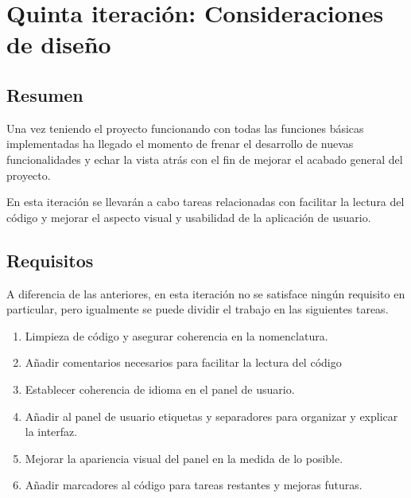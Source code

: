 
\section{Quinta iteración: Consideraciones de diseño}
    \subsection{Resumen}
    
        Una vez teniendo el proyecto funcionando con todas las funciones básicas implementadas ha llegado el momento de frenar el desarrollo de nuevas funcionalidades y echar la vista atrás con el fin de mejorar el acabado general del proyecto.
        
        En esta iteración se llevarán a cabo tareas relacionadas con facilitar la lectura del código y mejorar el aspecto visual y usabilidad de la aplicación de usuario.
    
    \subsection{Requisitos}
    
        A diferencia de las anteriores, en esta iteración no se satisface ningún requisito en particular, pero igualmente se puede dividir el trabajo en las siguientes tareas.
        
        \begin{enumerate}
            \item Limpieza de código y asegurar coherencia en la nomenclatura.
            \item Añadir comentarios necesarios para facilitar la lectura del código
            \item Establecer coherencia de idioma en el panel de usuario.
            \item Añadir al panel de usuario etiquetas y separadores para organizar y explicar la interfaz.
            \item Mejorar la apariencia visual del panel en la medida de lo posible.
            \item Añadir marcadores al código para tareas restantes y mejoras futuras. 
        \end{enumerate}
